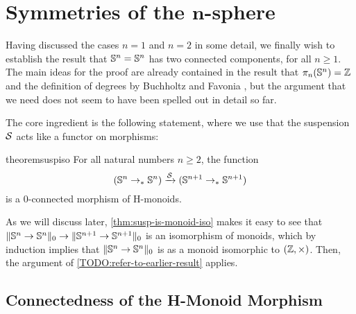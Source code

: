 \documentclass[english,a4]{article}
\newcommand{\setTrunc}[1]{\Trunc{#1}_0}
\begin{document}
\section{Symmetries of the $\boldsymbol n$-sphere}
\label{sec:higher-sphere}



Having discussed the cases $n = 1$ and $n = 2$ in some detail, we finally wish to establish the result that ${\mathbb S^{n}} = {\mathbb S^{n}}$ has two connected components, for all $n \geq 1$.
The main ideas for the proof are already contained in the result that $\pi_n({\mathbb S^{n}}) = \mathbb{Z}$ \cite{licataBrunerie_s1again} and the definition of degrees by Buchholtz and Favonia \cite{Buchholtz2018CellularCI}, but the argument that we need does not seem to have been spelled out in detail so far.

The core ingredient is the following statement,
where we use that the suspension $\operatorname{\mathcal S}$ acts like a functor on morphisms:
\begin{restatable}{theorem}{suspiso}
    \label{thm:susp-is-monoid-iso}
    For all natural numbers $n \geq 2$, the function
    \begin{equation} \label{eq:susp-monoid-morphism}
    ({\mathbb S^{n}} \to_* {\mathbb S^{n}}) \xrightarrow{\operatorname{\mathcal S}} ({\mathbb S^{n+1}} \to_* {\mathbb S^{n+1}})
    \end{equation}
    is a $0$-connected morphism of H-monoids.
\end{restatable}

As we will discuss later, \cref{thm:susp-is-monoid-iso} makes it easy to see that $\setTrunc {\Sn n \to \Sn n} \to \setTrunc {\Sn {n+1} \to \Sn {n+1}}$ is an isomorphism of monoids, which by induction implies that $\setTrunc {\Sn n \to \Sn n}$ is as a monoid isomorphic to $(\mathbb{Z}, \times)$. Then, the argument of \cref{TODO:refer-to-earlier-result} applies.

\subsection{Connectedness of the H-Monoid Morphism}
\end{document}
